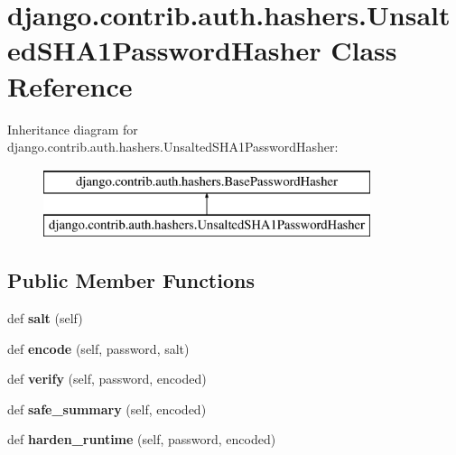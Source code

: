 \hypertarget{classdjango_1_1contrib_1_1auth_1_1hashers_1_1_unsalted_s_h_a1_password_hasher}{}\section{django.\+contrib.\+auth.\+hashers.\+Unsalted\+S\+H\+A1\+Password\+Hasher Class Reference}
\label{classdjango_1_1contrib_1_1auth_1_1hashers_1_1_unsalted_s_h_a1_password_hasher}
Inheritance diagram for django.\+contrib.\+auth.\+hashers.\+Unsalted\+S\+H\+A1\+Password\+Hasher\+:\begin{figure}[H]
\begin{center}
\leavevmode
\includegraphics[height=2.000000cm]{classdjango_1_1contrib_1_1auth_1_1hashers_1_1_unsalted_s_h_a1_password_hasher}
\end{center}
\end{figure}
\subsection*{Public Member Functions}
\begin{DoxyCompactItemize}
\item 
\mbox{\label{classdjango_1_1contrib_1_1auth_1_1hashers_1_1_unsalted_s_h_a1_password_hasher_aabbe33e0278a4e020ecd6a4bacb34656}} 
def {\bfseries salt} (self)
\item 
\mbox{\label{classdjango_1_1contrib_1_1auth_1_1hashers_1_1_unsalted_s_h_a1_password_hasher_afd87f227c48e6bdf05446bbe14ad29d6}} 
def {\bfseries encode} (self, password, salt)
\item 
\mbox{\label{classdjango_1_1contrib_1_1auth_1_1hashers_1_1_unsalted_s_h_a1_password_hasher_a12f43e6d0c6e2ce5338f1a2928f09be8}} 
def {\bfseries verify} (self, password, encoded)
\item 
\mbox{\label{classdjango_1_1contrib_1_1auth_1_1hashers_1_1_unsalted_s_h_a1_password_hasher_a26c8bfe86e7ecea2e05849ce5d9be361}} 
def {\bfseries safe\+\_\+summary} (self, encoded)
\item 
\mbox{\label{classdjango_1_1contrib_1_1auth_1_1hashers_1_1_unsalted_s_h_a1_password_hasher_a19c4bd71683f05ded70ffdded88c726f}} 
def {\bfseries harden\+\_\+runtime} (self, password, encoded)
\end{DoxyCompactItemize}
